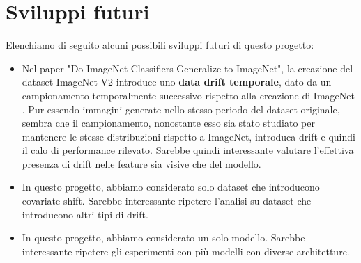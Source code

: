 \section{Sviluppi futuri}
Elenchiamo di seguito alcuni possibili sviluppi futuri di questo progetto:
\begin{itemize}
    \item Nel paper "Do ImageNet Classifiers Generalize to ImageNet", la creazione del dataset ImageNet-V2 introduce uno \textbf{data drift temporale}, dato da un campionamento temporalmente successivo rispetto alla creazione di ImageNet \cite{recht_imagenet_2019}. Pur essendo immagini generate nello stesso periodo del dataset originale, sembra che il campionamento, nonostante esso sia stato studiato per mantenere le stesse distribuzioni rispetto a ImageNet, introduca drift e quindi il calo di performance rilevato. Sarebbe quindi interessante valutare l'effettiva presenza di drift nelle feature sia visive che del modello.
    \item In questo progetto, abbiamo considerato solo dataset che introducono covariate shift. Sarebbe interessante ripetere l'analisi su dataset che introducono altri tipi di drift.
    \item In questo progetto, abbiamo considerato un solo modello. Sarebbe interessante ripetere gli esperimenti con più modelli con diverse architetture.
\end{itemize}

